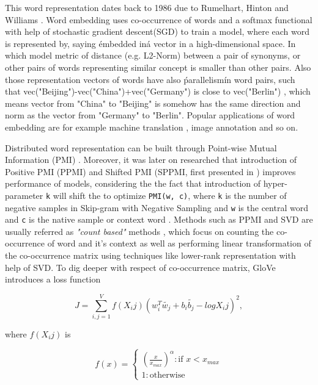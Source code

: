 \documentclass[11pt,a4paper]{article}
\begin{document}
This word representation dates back to 1986 due to Rumelhart, Hinton and Williams \cite{williams1986learning}. Word embedding uses co-occurrence of words and a softmax functional with help of stochastic gradient descent(SGD) to train a model, where each word is represented by, saying \'embedded in\' a vector in a high-dimensional space. In which model metric of distance (e.g. L2-Norm) between a pair of synonyms, or other pairs of words representing similar concept is smaller than other pairs. Also those representation vectors of words have also \'parallelism\' in word pairs, such that vec("Beijing")-vec("China")+vec("Germany") is close to vec("Berlin") \cite{le2014distributed}, which means vector from "China" to "Beijing" is somehow has the same direction and norm as the vector from "Germany" to "Berlin". Popular applications of word embedding are for example machine translation \cite{cho2014learning}, image annotation \cite{weston2011wsabie} and so on. 

Distributed word representation can be built through Point-wise Mutual Information (PMI) \cite{church1990word}. Moreover, it was later on researched that introduction of Positive PMI (PPMI) \cite{bullinaria2007extracting} and Shifted PMI (SPPMI, first presented in \cite{goldberg2014word2vec}) improves performance of models, considering the the fact that introduction of hyper-parameter \verb|k| will shift the to optimize \verb|PMI(w, c)|, where \verb|k| is the number of negative samples in Skip-gram with Negative Sampling and \verb|w| is the central word and \verb|c| is the native sample or context word \cite{levy2014neural}. Methods such as PPMI and SVD are usually referred as \emph{"count based"} methods \cite{levy2015improving}, which focus on counting the co-occurrence of word and it's context as well as performing linear transformation of the co-occurrence matrix using techniques like lower-rank representation with help of SVD. To dig deeper with respect of co-occurrence matrix, GloVe \cite{Pennington2014glove} introduces a loss function

\begin{equation}
J=\sum_{i,j=1}^{V}f(X_ij)(w_i^T\tilde{w_j}+b_i\tilde{b_j}-logX_ij)^2,
\end{equation}

where $f(X_ij)$ is

\[f(x)=\begin{cases}
    (\frac{x}{x_{max}})^\alpha : \text{if }x<x_{max}\\
    1 : \text{otherwise}
    \end{cases}
\]
\end{document}
